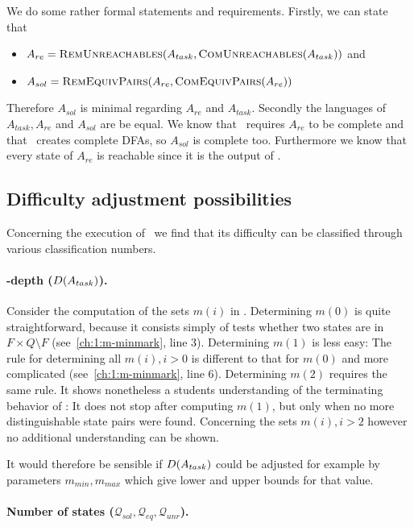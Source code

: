 We do some rather formal statements and requirements. Firstly, we can state that
\begin{itemize}
	\item $A_{re} = \textsc{RemUnreachables}(A_{task}, \textsc{ComUnreachables}(A_{task}))$ and
	\item $A_{sol} = \textsc{RemEquivPairs}(A_{re}, \textsc{ComEquivPairs}(A_{re}))$
\end{itemize}
Therefore $A_{sol}$ is minimal regarding $A_{re}$ and $A_{task}$. Secondly the languages of $A_{task}, A_{re}$ and $A_{sol}$ are be equal. We know that \CompDist\ requires $A_{re}$ to be complete and that \RemEq\ creates complete DFAs, so $A_{sol}$ is complete too. Furthermore we know that every state of $A_{re}$ is reachable since it is the output of \RemUnr.


\subsection{Difficulty adjustment possibilities}

Concerning the execution of \MinAlg\ we find that its difficulty can be classified through various classification numbers.

\paragraph*{\CompDist-depth ($D(A_{task})$).}

Consider the computation of the sets $m(i)$ in \CompDist. Determining $m(0)$ is quite straightforward, because it consists simply of tests whether two states are in $F \times Q \setminus F$ (see~\ref{ch:1:m-minmark}, line 3). Determining $m(1)$ is less easy: The rule for determining all $m(i), i > 0$ is different to that for $m(0)$ and more complicated (see~\ref{ch:1:m-minmark}, line 6). Determining $m(2)$ requires the same rule. It shows nonetheless a students understanding of the terminating behavior of \CompDist: It does not stop after computing $m(1)$, but only when no more distinguishable state pairs were found. Concerning the sets $m(i), i > 2$ however no additional understanding can be shown.

It would therefore be sensible if $D(A_{task})$ could be adjusted for example by parameters $m_{min}, m_{max}$ which give lower and upper bounds for that value.

\paragraph*{Number of states ($\mathcal{Q}_{sol}, \mathcal{Q}_{eq}, \mathcal{Q}_{unr}$).}

